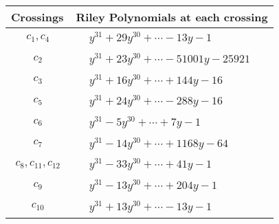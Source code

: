 \documentclass[1p]{elsarticle_modified}
\theoremstyle{definition}
\begin{document}
\begin{tabular}{m{50pt}|m{274pt}}
Crossings & \hspace{64pt}Riley Polynomials at each crossing \\
\hline $$\begin{aligned}c_{1},c_{4}\end{aligned}$$&$\begin{aligned}
&y^{31}+29 y^{30}+\cdots-13 y-1
\end{aligned}$\\
\hline $$\begin{aligned}c_{2}\end{aligned}$$&$\begin{aligned}
&y^{31}+23 y^{30}+\cdots-51001 y-25921
\end{aligned}$\\
\hline $$\begin{aligned}c_{3}\end{aligned}$$&$\begin{aligned}
&y^{31}+16 y^{30}+\cdots+144 y-16
\end{aligned}$\\
\hline $$\begin{aligned}c_{5}\end{aligned}$$&$\begin{aligned}
&y^{31}+24 y^{30}+\cdots-288 y-16
\end{aligned}$\\
\hline $$\begin{aligned}c_{6}\end{aligned}$$&$\begin{aligned}
&y^{31}-5 y^{30}+\cdots+7 y-1
\end{aligned}$\\
\hline $$\begin{aligned}c_{7}\end{aligned}$$&$\begin{aligned}
&y^{31}-14 y^{30}+\cdots+1168 y-64
\end{aligned}$\\
\hline $$\begin{aligned}c_{8},c_{11},c_{12}\end{aligned}$$&$\begin{aligned}
&y^{31}-33 y^{30}+\cdots+41 y-1
\end{aligned}$\\
\hline $$\begin{aligned}c_{9}\end{aligned}$$&$\begin{aligned}
&y^{31}-13 y^{30}+\cdots+204 y-1
\end{aligned}$\\
\hline $$\begin{aligned}c_{10}\end{aligned}$$&$\begin{aligned}
&y^{31}+13 y^{30}+\cdots-13 y-1
\end{aligned}$\\
\hline
\end{tabular}\\~\\
\end{document}
